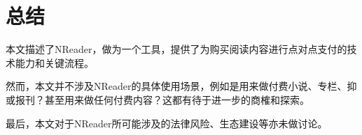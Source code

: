 \section{总结}
本文描述了NReader，做为一个工具，提供了为购买阅读内容进行点对点支付的技术能力和关键流程。

然而，本文并不涉及NReader的具体使用场景，例如是用来做付费小说、专栏、抑或报刊？甚至用来做任何付费内容？这都有待于进一步的商榷和探索。

最后，本文对于NReader所可能涉及的法律风险、生态建设等亦未做讨论。